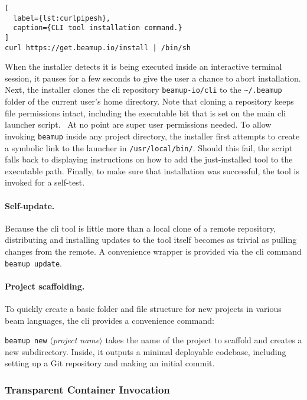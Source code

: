 \begin{lstlisting}[
  label={lst:curlpipesh},
  caption={CLI tool installation command.}
]
curl https://get.beamup.io/install | /bin/sh
\end{lstlisting}

When the installer detects it is being executed inside an interactive terminal session, it pauses for a few seconds to give the user a chance to abort installation. Next, the installer clones the \acrshort{cli} repository \lstinline|beamup-io/cli| to the \lstinline|~/.beamup| folder of the current user's home directory. Note that cloning a repository keeps file permissions intact, including the executable bit that is set on the main \acrshort{cli} launcher script.~\cite{sink2011version} At no point are super user permissions needed. To allow invoking \lstinline|beamup| inside any project directory, the installer first attempts to create a symbolic link to the launcher in \lstinline|/usr/local/bin/|. Should this fail, the script falls back to displaying instructions on how to add the just-installed tool to the executable path. Finally, to make sure that installation was successful, the tool is invoked for a self-test.

\paragraph{Self-update.} Because the \acrshort{cli} tool is little more than a local clone of a remote repository, distributing and installing updates to the tool itself becomes as trivial as pulling changes from the remote. A convenience wrapper is provided via the \acrshort{cli} command \lstinline|beamup update|.

\paragraph{Project scaffolding.} To quickly create a basic folder and file structure for new projects in various \acrshort{beam} languages, the \acrshort{cli} provides a convenience command:

\lstinline|beamup new| $\langle$\emph{project name}$\rangle$ takes the name of the project to scaffold and creates a new subdirectory. Inside, it outputs a minimal deployable codebase, including setting up a Git repository and making an initial commit.

\subsubsection{Transparent Container Invocation}

